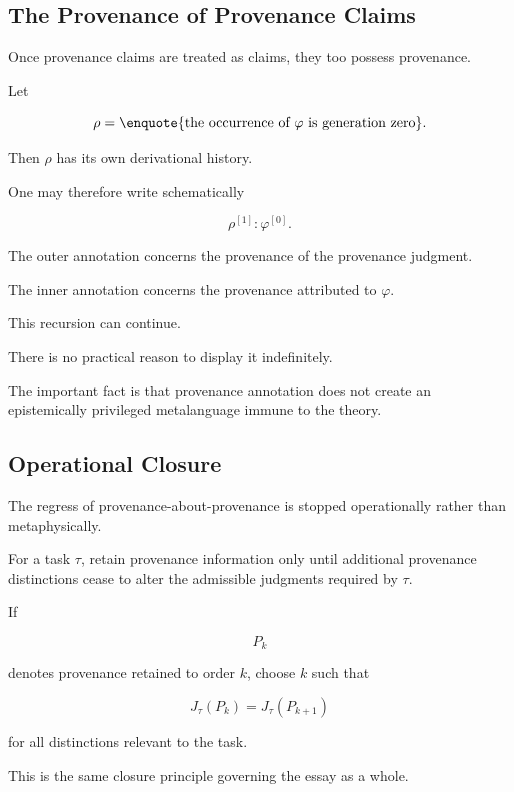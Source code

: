 \documentclass[
  11pt,
  a4paper,
  DIV=12,
  BCOR=0mm,
  parskip=half-
]{scrartcl}
\theoremstyle{definition}
\theoremstyle{plain}
\theoremstyle{remark}
\begin{document}
\subsection{The Provenance of Provenance Claims}
\label{app:second-order-provenance}

Once provenance claims are treated as claims, they too possess provenance.

Let

\[
  \rho
  =
  \text{\enquote{the occurrence of \(\varphi\) is generation zero}}.
\]

Then \(\rho\) has its own derivational history.

One may therefore write schematically

\[
  \rho^{[1]}
  :
  \varphi^{[0]}.
\]

The outer annotation concerns the provenance of the provenance judgment.

The inner annotation concerns the provenance attributed to \(\varphi\).

This recursion can continue.

There is no practical reason to display it indefinitely.

The important fact is that provenance annotation does not create an
epistemically privileged metalanguage immune to the theory.


\subsection{Operational Closure}
\label{app:provenance-regress}

The regress of provenance-about-provenance is stopped operationally rather
than metaphysically.

For a task \(\tau\), retain provenance information only until additional
provenance distinctions cease to alter the admissible judgments required by
\(\tau\).

If

\[
  P_k
\]

denotes provenance retained to order \(k\), choose \(k\) such that

\[
  J_\tau(P_k)
  =
  J_\tau(P_{k+1})
\]

for all distinctions relevant to the task.

This is the same closure principle governing the essay as a whole.
\end{document}

